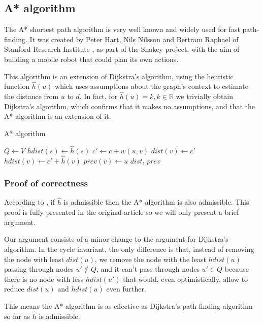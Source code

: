 \subsection{A* algorithm} \label{algorithm-shortestpath-astar}
The A* shortest path algorithm is very well known and widely used for fast path-finding. It was created by Peter Hart, Nils Nilsson and Bertram Raphael of Stanford Research Institute \cite{Astar}, as part of the Shakey project, with the aim of building a mobile robot that could plan its own actions.\par
This algorithm is an extension of Dijkstra's algorithm, using the heuristic function $\hat{h}(u)$ which uses assumptions about the graph's context to estimate the distance from $u$ to $d$. In fact, for $\hat{h}(u) = k, k \in \mathbb{R}$ we trivially obtain Dijkstra's algorithm, which confirms that it makes no assumptions, and that the A* algorithm is an extension of it.
\begin{algorithm}[ht]
    \caption{A* algorithm}
    \label{alg-astar}
    \begin{algorithmic}[1]
             
            \EndFor
            \State $Q \gets V$
            \State $hdist(s) \gets \hat{h}(s)$
             
                    \State $c' \gets c + w(u, v)$
                        \State $dist(v) \gets c'$
                        \State $hdist(v) \gets c'+\hat{h}(v)$
                        \State $prev(v) \gets u$
                    \EndIf
                \EndFor
            \EndWhile
            \State \Return $dist$, $prev$
        \EndFunction
    \end{algorithmic}
\end{algorithm}
\subsubsection{Proof of correctness}
According to \cite{Astar}, if $\hat{h}$ is \gls{admissible} then the A* algorithm is also \gls{admissible}. This proof is fully presented in the original article so we will only present a brief argument.\par
Our argument consists of a minor change to the argument for Dijkstra's algorithm. In the cycle invariant, the only difference is that, instead of removing the node with least $dist(u)$, we remove the node with the least $hdist(u)$ passing through nodes $u' \not \in Q$, and it can't pass through nodes $u' \in Q$ because there is no node with less $hdist(u')$ that would, even optimistically, allow to reduce $dist(u)$ and $hdist(u)$ even further.\par
This means the A* algorithm is as effective as Dijkstra's path-finding algorithm so far as $\hat{h}$ is admissible.
